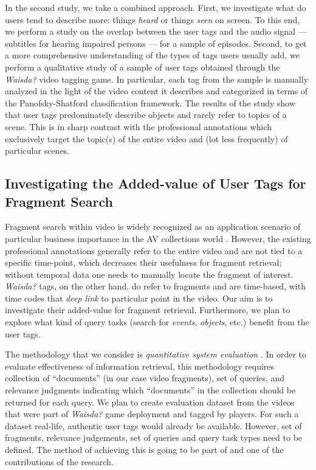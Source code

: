 In the second study, we take a combined approach. First, we investigate what do users tend to describe  more: things \textit{heard} or things \textit{seen} on screen. To this end, we perform a study on the overlap between the user tags and the audio signal --- subtitles for hearing impaired persons --- for a sample of episodes. Second, to get a more comprehensive understanding of the types of tags users usually add, we perform a qualitative study of a sample of user tags obtained through the \textit{Waisda?} video tagging game. In particular, each tag from the sample is manually analyzed in the light of the video content it describes and categorized in terms of the Panofsky-Shatford classification framework. The results of the study show that user tags predominately describe objects and rarely refer to topics of a scene. This is in sharp contrast with the professional annotations which  exclusively target the topic(s) of the entire video and (lot less frequently) of particular scenes. 


\subsection{Investigating the Added-value of User Tags for Fragment Search}\label{sec:fragment-search}
Fragment search within video is widely recognized as an application scenario of particular business importance in the AV collections world \cite{fragmentpercent}. However, the existing professional annotations generally refer to the entire video and are not tied to a specific time-point, which decreases their usefulness for fragment retrieval; without temporal data one needs to manually locate the fragment of interest. \textit{Waisda?} tags, on the other hand, do refer to fragments and are time-based, with time codes that \textit{deep link} to particular point in the video. Our aim is to investigate their added-value for fragment retrieval. Furthermore, we plan to explore what kind of query tasks (search for \textit{events}, \textit{objects}, etc.)  benefit from the user tags.

The methodology that we consider is \textit{quantitative system evaluation} \cite{vorhees}. In order to evaluate effectiveness of information retrieval, this methodology requires collection of ``documents'' (in our case video fragments), set of queries, and relevance judgments  indicating which ``documents'' in the collection should be returned for each query. We plan to create evaluation dataset from the videos that were part of \textit{Waisda?} game deployment and tagged by players. For such a dataset real-life, authentic user tags would already be available. However, set of fragments, relevance judgements, set of queries and query task types need to be defined. The method of achieving this is going to be part of and one of the contributions of the research.
	
